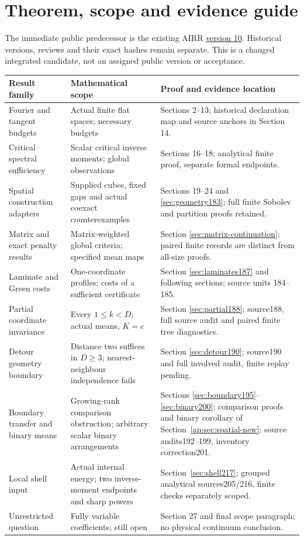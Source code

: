 \documentclass[11pt]{article}
\begin{document}
\section*{Theorem, scope and evidence guide}
The immediate public predecessor is the existing AIRR
\href{https://airr.science/papers/ARR-2026-7EPM3V3DP796BBRR/versions/v10/}{version 10}.
Historical versions, reviews and their exact hashes remain separate. This is a
changed integrated candidate, not an assigned public version or acceptance.
\begin{center}\small
\begin{tabular}{@{}p{}p{}p{}@{}}
\toprule
Result family & Mathematical scope & Proof and evidence location\\\midrule
Fourier and tangent budgets & Actual finite flat spaces; necessary budgets & Sections 2--13; historical declaration map and source anchors in Section 14.\\[5pt]
Critical spectral sufficiency & Scalar critical inverse moments; global observations & Sections 16--18; analytical finite proof, separate formal endpoints.\\[5pt]
Spatial construction adapters & Supplied cubes, fixed gaps and actual coexact counterexamples & Sections 19--24 and \ref{sec:geometry183}; full finite Sobolev and partition proofs retained.\\[5pt]
Matrix and exact penalty results & Matrix-weighted global criteria; specified mean maps & Section \ref{sec:matrix-continuation}; paired finite records are distinct from all-size proofs.\\[5pt]
Laminate and Green costs & One-coordinate profiles; costs of a sufficient certificate & Section \ref{sec:laminates187} and following sections; source units 184--185.\\[5pt]
Partial coordinate invariance & Every $1\le k<D$; actual means, $K=c$ & Section \ref{sec:partial188}; source188, full source audit and paired finite tree diagnostics.\\[5pt]
Detour geometry boundary & Distance two suffices in $D\ge3$; nearest-neighbour independence fails & Section \ref{sec:detour190}; source190 and full involved audit, finite replay pending.\\[5pt]
Boundary transfer and binary means & Growing-rank comparison obstruction; arbitrary scalar binary arrangements & Sections \ref{sec:boundary195}--\ref{sec:binary200}; comparison proofs and binary corollary of Section~\ref{ap:sec:spatial-new}; source audits192--199, inventory correction201.\\[5pt]
Local shell input & Actual internal energy; two inverse-moment endpoints and sharp powers & Section~\ref{sec:shell217}; grouped analytical sources205/216, finite checks separately scoped.\\[5pt]
Unrestricted question & Fully variable coefficients; still open & Section 27 and final scope paragraph; no physical continuum conclusion.\\
\bottomrule
\end{tabular}
\end{center}
\end{document}
